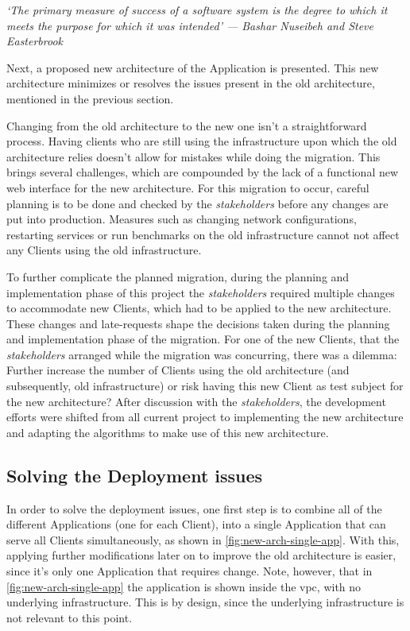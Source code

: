 \begin{displayquote}
\textit{`The primary measure of success of a software system is the degree to which it meets the purpose for which it was intended' --- Bashar Nuseibeh and Steve Easterbrook }
\end{displayquote}

Next, a proposed new architecture of the Application is presented. This new architecture minimizes or resolves the issues present in the old architecture, mentioned in the previous section.

Changing from the old architecture to the new one isn't a straightforward process. Having clients who are still using the infrastructure upon which the old architecture relies doesn't allow for mistakes while doing the migration. This brings several challenges, which are compounded by the lack of a functional new web interface for the new architecture. For this migration to occur, careful planning is to be done and checked by the \textit{stakeholders} before any changes are put into production. Measures such as changing network configurations, restarting services or run benchmarks on the old infrastructure cannot not affect any Clients using the old infrastructure.

To further complicate the planned migration, during the planning and implementation phase of this project the \textit{stakeholders} required multiple changes to accommodate new Clients, which had to be applied to the new architecture. These changes and late-requests shape the decisions taken during the planning and implementation phase of the migration. For one of the new Clients, that the \textit{stakeholders} arranged while the migration was concurring, there was a dilemma: Further increase the number of Clients using the old architecture (and subsequently, old infrastructure) or risk having this new Client as test subject for the new architecture? After discussion with the \textit{stakeholders}, the development efforts were shifted from all current project to implementing the new architecture and adapting the algorithms to make use of this new architecture.


\subsection{Solving the Deployment issues}\label{methodology:ss:solving-the-deployment-issues}

In order to solve the deployment issues, one first step is to combine all of the different Applications (one for each Client), into a single Application that can serve all Clients simultaneously, as shown in \cref{fig:new-arch-single-app}. With this, applying further modifications later on to improve the old architecture is easier, since it's only one Application that requires change. Note, however, that in \cref{fig:new-arch-single-app} the application is shown inside the \gls{vpc}, with no underlying infrastructure. This is by design, since the underlying infrastructure is not relevant to this point.

